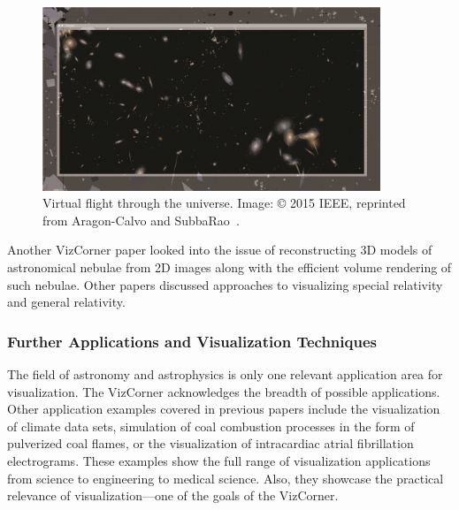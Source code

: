 \documentclass[10pt,journal,compsoc]{IEEEtran}
\begin{document}
\begin{figure}
    \begin{center}    
        \includegraphics[width=0.9\textwidth]{galaxies.png}
        \caption{Virtual flight through the universe. 
 Image: \copyright{} 2015 IEEE, reprinted from Aragon-Calvo and SubbaRao~\cite{Aragon-Calvo2015}.
  \label{fig:galaxies}}        
    \end{center}
\end{figure}

Another VizCorner paper looked into the issue of reconstructing 3D models of astronomical nebulae from 2D images along with the efficient volume rendering of such nebulae. Other papers discussed approaches to visualizing special relativity and general relativity. 


\subsubsection{Further Applications and Visualization Techniques}

The field of astronomy and astrophysics is only one relevant application area for visualization. The VizCorner acknowledges the breadth of possible applications. Other application examples covered in previous papers include the visualization of climate data sets, simulation of coal combustion processes in the form of pulverized coal flames, or the visualization of intracardiac atrial fibrillation electrograms. These examples show the full range of visualization applications from science to engineering to medical science. Also, they showcase the practical relevance of visualization---one of the goals of the VizCorner. 
\end{document}
